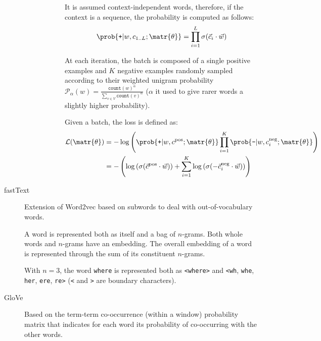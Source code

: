\begin{description}
\begin{description}
\begin{description}
                        It is assumed context-independent words, therefore, if the context is a sequence, the probability is computed as follows:
                        \[ \prob{\texttt{+} | w, c_{1..L}; \matr{\theta}} = \prod_{i=1}^{L} \sigma(\vec{c}_i \cdot \vec{w}) \]

                        At each iteration, the batch is composed of a single positive examples and $K$ negative examples randomly sampled according to their weighted unigram probability $\mathcal{P}_\alpha(w) = \frac{\texttt{count}(w)^\alpha}{\sum_{v \in V} \texttt{count}(v)^\alpha}$ ($\alpha$ it used to give rarer words a slightly higher probability).

                        Given a batch, the loss is defined as:
                        \[
                            \begin{split}
                                \mathcal{L}(\matr{\theta}) &= -\log\left( \prob{\texttt{+} | w, c^\text{pos}; \matr{\theta}} \prod_{i=1}^{K} \prob{\texttt{-} | w, c^\text{neg}_{i}; \matr{\theta}} \right) \\
                                &= - \left( \log\left( \sigma(\vec{c}^\text{pos} \cdot \vec{w}) \right) + \sum_{i=1}^{K} \log\left( \sigma(-\vec{c}^\text{neg}_{i} \cdot \vec{w}) \right) \right)
                            \end{split}
                        \]
                \end{description}
        \end{description}


    \item[fastText] 
        Extension of Word2vec based on subwords to deal with out-of-vocabulary words.

        A word is represented both as itself and a bag of $n$-grams. Both whole words and $n$-grams have an embedding. The overall embedding of a word is represented through the sum of its constituent $n$-grams.

        \begin{example}
            With $n=3$, the word \texttt{where} is represented both as \texttt{<where>} and \texttt{<wh}, \texttt{whe}, \texttt{her}, \texttt{ere}, \texttt{re>} (\texttt{<} and \texttt{>} are boundary characters).
        \end{example}

    \item[GloVe] 
        Based on the term-term co-occurrence (within a window) probability matrix that indicates for each word its probability of co-occurring with the other words.


\end{description}
